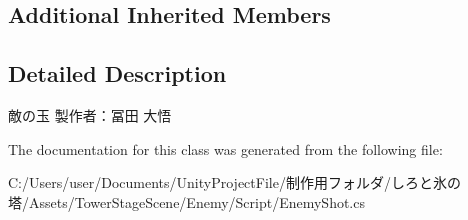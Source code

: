 \subsection*{Additional Inherited Members}


\subsection{Detailed Description}
敵の玉 製作者：冨田 大悟 



The documentation for this class was generated from the following file\+:\begin{DoxyCompactItemize}
\item 
C\+:/\+Users/user/\+Documents/\+Unity\+Project\+File/制作用フォルダ/しろと氷の塔/\+Assets/\+Tower\+Stage\+Scene/\+Enemy/\+Script/Enemy\+Shot.\+cs\end{DoxyCompactItemize}
